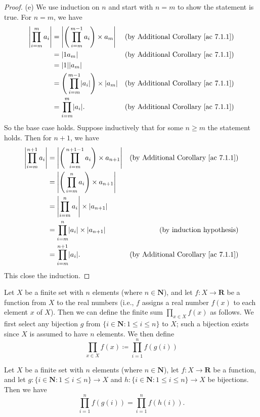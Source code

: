 \begin{proof}{(e)}
We use induction on \(n\) and start with \(n = m\) to show the statement is true.
For \(n = m\), we have
\begin{align*}
\abs*{\prod_{i = m}^m a_i} &= \abs*{\Bigg(\prod_{i = m}^{m - 1} a_i\Bigg) \times a_m} & \text{(by Additional Corollary \ref{ac 7.1.1})} \\
&= \abs*{1a_m} & \text{(by Additional Corollary \ref{ac 7.1.1})} \\
&= \abs*{1}\abs*{a_m} \\
&= \Bigg(\prod_{i = m}^{m - 1} \abs*{a_i}\Bigg) \times \abs*{a_m} & \text{(by Additional Corollary \ref{ac 7.1.1})} \\
&= \prod_{i = m}^m \abs*{a_i}. & \text{(by Additional Corollary \ref{ac 7.1.1})}
\end{align*}
So the base case holds.
Suppose inductively that for some \(n \geq m\) the statement holds.
Then for \(n + 1\), we have
\begin{align*}
\abs*{\prod_{i = m}^{n + 1} a_i} &= \abs*{\Bigg(\prod_{i = m}^{n + 1 - 1} a_i\Bigg) \times a_{n + 1}} & \text{(by Additional Corollary \ref{ac 7.1.1})} \\
&= \abs*{\Bigg(\prod_{i = m}^n a_i\Bigg) \times a_{n + 1}} \\
&= \abs*{\prod_{i = m}^n a_i} \times \abs*{a_{n + 1}} \\
&= \prod_{i = m}^n \abs*{a_i} \times \abs*{a_{n + 1}} & \text{(by induction hypothesis)} \\
&= \prod_{i = m}^{n + 1} \abs*{a_i}. & \text{(by Additional Corollary \ref{ac 7.1.1})}
\end{align*}
This close the induction.
\end{proof}

\begin{additional corollary}\label{ac 7.1.3}
Let \(X\) be a finite set with \(n\) elements (where \(n \in \mathbf{N}\)), and let \(f : X \to \mathbf{R}\) be a function from \(X\) to the real numbers
(i.e., \(f\) assigns a real number \(f(x)\) to each element \(x\) of \(X\)).
Then we can define the finite sum \(\prod_{x \in X} f(x)\) as follows.
We first select any bijection \(g\) from \(\{i \in \mathbf{N} : 1 \leq i \leq n\}\) to \(X\);
such a bijection exists since \(X\) is assumed to have \(n\) elements.
We then define
\[
    \prod_{x \in X} f(x) \coloneqq \prod_{i = 1}^n f(g(i))
\]
\end{additional corollary}

\begin{additional corollary}\label{ac 7.1.4}
Let \(X\) be a finite set with \(n\) elements (where \(n \in \mathbf{N}\)), let \(f : X \to \mathbf{R}\) be a function, and let \(g : \{i \in \mathbf{N} : 1 \leq i \leq n\} \to X\) and \(h : \{i \in \mathbf{N} : 1 \leq i \leq n\} \to X\) be bijections.
Then we have
\[
    \prod_{i = 1}^n f(g(i)) = \prod_{i = 1}^n f(h(i)).
\]
\end{additional corollary}

